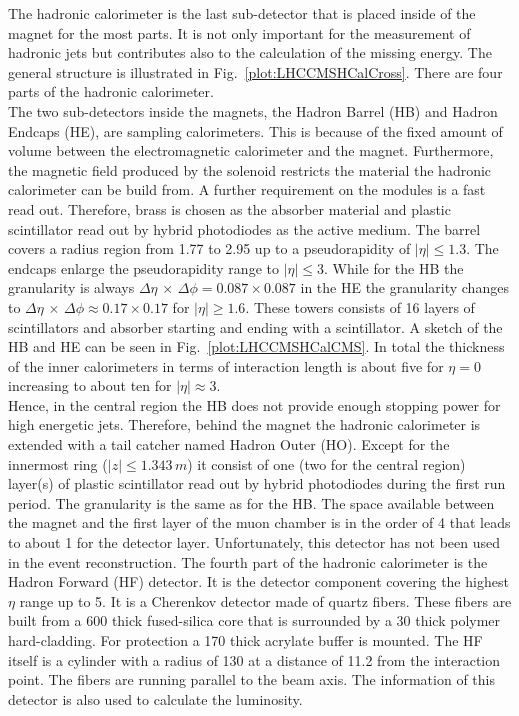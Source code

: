 The hadronic calorimeter is the last sub-detector that is placed inside of the magnet for the most parts. It is not only important for the measurement of hadronic jets but contributes also to the calculation of the missing energy. The general structure is illustrated in Fig.~\ref{plot:LHCCMSHCalCross}. There are four parts of the hadronic calorimeter.\\
The two sub-detectors inside the magnets, the Hadron Barrel (HB) and Hadron Endcaps (HE), are sampling calorimeters. This is because of the fixed amount of volume between the electromagnetic calorimeter and the magnet. Furthermore, the magnetic field produced by the solenoid restricts the material the hadronic calorimeter can be build from. A further requirement on the modules is a fast read out. Therefore, brass is chosen as the absorber material and plastic scintillator read out by hybrid photodiodes as the active medium. The barrel covers a radius region from 1.77 to 2.95\m{} up to a pseudorapidity of $\left|\eta{}\right| \leq{} 1.3$. The endcaps enlarge the pseudorapidity range to $\left|\eta{}\right| \leq{} 3$. While for the HB the granularity is always $\Delta{}\eta\,\times\,\Delta{}\phi{} = 0.087 \times{} 0.087$ in the HE the granularity changes to $\Delta{}\eta\,\times\,\Delta{}\phi{} \approx 0.17 \times{} 0.17$ for $\left|\eta{}\right| \geq{} 1.6$. These towers consists of 16 layers of scintillators and absorber starting and ending with a scintillator. A sketch of the HB and HE can be seen in Fig.~\ref{plot:LHCCMSHCalCMS}. In total the thickness of the inner calorimeters in terms of interaction length is about five for $\eta{}=0$ increasing to about ten for $\left|\eta{}\right|\approx{}3$.\\
Hence, in the central region the HB does not provide enough stopping power for high energetic jets. Therefore, behind the magnet the hadronic calorimeter is extended with a tail catcher named Hadron Outer (HO). Except for the innermost ring ($\left|z\right| \leq{} 1.343\,m$) it consist of one (two for the central region) layer(s) of plastic scintillator read out by hybrid photodiodes during the first run period. The granularity is the same as for the HB. The space available between the magnet and the first layer of the muon chamber is in the order of 4\cm{} that leads to about 1\cm{} for the detector layer. Unfortunately, this detector has not been used in the event reconstruction.
The fourth part of the hadronic calorimeter is the Hadron Forward (HF) detector. It is the detector component  covering the  highest $\eta{}$ range up to 5. It is a Cherenkov detector made of quartz fibers. These fibers are built from a 600\mum{} thick fused-silica core that is surrounded by a 30\mum{} thick polymer hard-cladding. For protection a 170\mum{} thick acrylate buffer is mounted. The HF itself is a cylinder with a radius of 130\cm{} at a distance of 11.2\m{} from the interaction point. The fibers are running parallel to the beam axis. The information of this detector is also used to calculate the luminosity.

